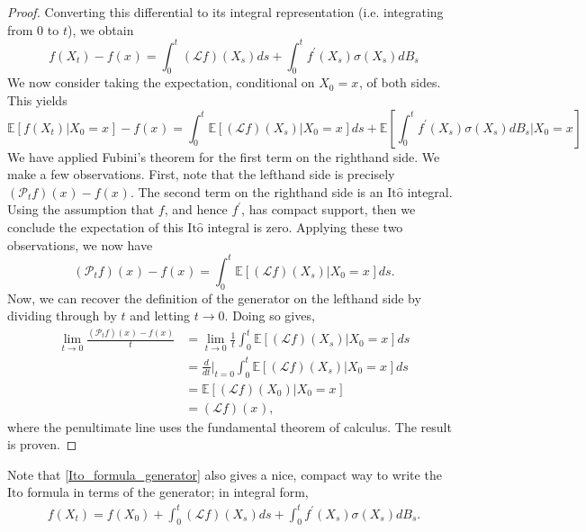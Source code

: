 \documentclass[12pt]{article}
\newcommand{\E}{\mathbb{E}}
\newcommand{\state}[1][t]{X_{#1}}
\newcommand{\stateValue}[1][t]{x_{#1}}
\newcommand{\BM}[1][t]{B_{#1}} %
\newcommand{\op}[1][t]{\mathcal{P}_{#1}} %
\newcommand{\gen}{\mathcal{L}} %
\newcommand{\ito}{\text{It}\hat{\text{o}}}
\begin{document}
\begin{proof}
Converting this differential to its integral representation (i.e. integrating from $0$ to $t$), we obtain 
\[
f(\state) - f(\stateValue[]) = \int_{0}^{t} (\gen f)(\state[s]) ds + \int_{0}^{t} f^\prime(\state[s]) \sigma(\state[s]) d\BM[s]
\]
We now consider taking the expectation, conditional on $\state[0] = \stateValue[]$, of both sides. This yields 
\[
\E[f(\state) | \state[0] = \stateValue[]] - f(\stateValue[]) = \int_{0}^{t} \E[(\gen f)(\state[s]) | \state[0] = \stateValue[]] ds + \E\left[\int_{0}^{t} f^\prime(\state[s]) \sigma(\state[s]) d\BM[s] \bigg| \state[0] = \stateValue[] \right] 
\]
We have applied Fubini's theorem for the first term on the righthand side. We make a few observations. First, note that the lefthand side is precisely $(\op f)(\stateValue[]) - f(\stateValue[])$. The second term on the righthand side 
is an $\ito$ integral. Using the assumption that $f$, and hence $f^\prime$, has compact support, then we conclude the expectation of this $\ito$ integral is zero. Applying these two observations, we now have
\[
(\op f)(\stateValue[]) - f(\stateValue[])  = \int_{0}^{t} \E[(\gen f)(\state[s]) | \state[0] = \stateValue[]] ds.
\] 
Now, we can recover the definition of the generator on the lefthand side by dividing through by $t$ and letting $t \to 0$. Doing so gives, 
\begin{align*}
\lim_{t \to 0} \frac{(\op f)(\stateValue[]) - f(\stateValue[]) }{t} 
&= \lim_{t \to 0} \frac{1}{t} \int_{0}^{t} \E[(\gen f)(\state[s]) | \state[0] = \stateValue[]] ds \\
&= \frac{d}{dt}\bigg|_{t=0} \int_{0}^{t} \E[(\gen f)(\state[s]) | \state[0] = \stateValue[]] ds \\
&= \E[(\gen f)(\state[0]) | \state[0] = \stateValue[]] \\
&= (\gen f)(\stateValue[]), 
\end{align*}
where the penultimate line uses the fundamental theorem of calculus. The result is proven. 
\end{proof}

Note that \ref{Ito_formula_generator} also gives a nice, compact way to write the $\ito$ formula in terms of the generator; in integral form, 
\begin{align}
f(\state) =  f(\state[0]) + \int_{0}^{t} (\gen f)(\state[s]) ds + \int_{0}^{t} f^\prime(\state[s]) \sigma(\state[s]) d\BM[s].
\end{align}

\end{document}
